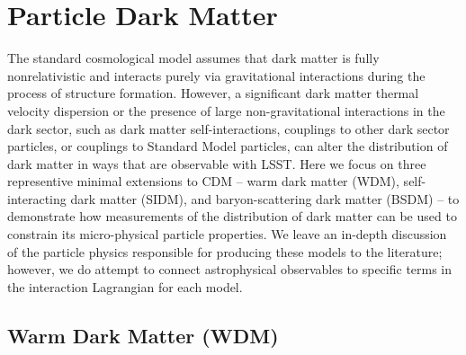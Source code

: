 \section{Particle Dark Matter }
\label{sec:particles}



The standard \LCDM cosmological model assumes that dark matter is fully nonrelativistic and interacts purely via gravitational interactions during the process of structure formation. However, a significant dark matter thermal velocity dispersion or the presence of large non-gravitational interactions in the dark sector, such as dark matter self-interactions, couplings to other dark sector particles, or couplings to Standard Model particles, can alter the distribution of dark matter in ways that are observable with LSST. Here we focus on three representive minimal extensions to CDM -- warm dark matter (WDM), self-interacting dark matter (SIDM), and baryon-scattering dark matter (BSDM) --  to demonstrate how measurements of the distribution of dark matter can be used to constrain its micro-physical particle properties. We leave an in-depth discussion of the particle physics responsible for producing these models to the literature; however, we do attempt to connect astrophysical observables to specific terms in the interaction Lagrangian for each model.

\subsection{Warm Dark Matter (WDM)}
\label{sec:wdm}

